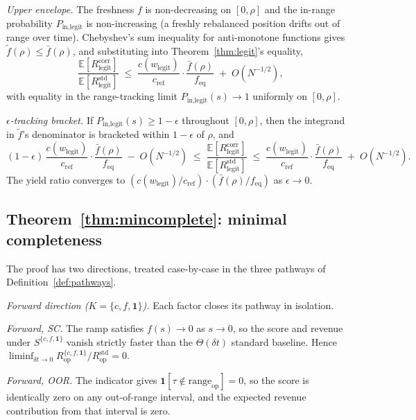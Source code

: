 \documentclass[11pt,a4paper]{article}
\theoremstyle{definition}
\theoremstyle{plain}
\theoremstyle{remark}
\begin{document}
\noindent\emph{Upper envelope.} The freshness $f$ is non-decreasing on $[0, \rho]$ and the in-range probability $P_{\text{in,legit}}$ is non-increasing (a freshly rebalanced position drifts out of range over time). Chebyshev's sum inequality for anti-monotone functions gives $\tilde f(\rho) \leq \bar f(\rho)$, and substituting into Theorem~\ref{thm:legit}'s equality,
\begin{equation}\label{eq:thm2upper}
\frac{\mathbb{E}[R^{\text{corr}}_{\text{legit}}]}{\mathbb{E}[R^{\text{std}}_{\text{legit}}]} \;\leq\; \frac{c(w_{\text{legit}})}{c_{\text{ref}}} \cdot \frac{\bar f(\rho)}{f_{\text{eq}}} \;+\; O(N^{-1/2}),
\end{equation}
with equality in the range-tracking limit $P_{\text{in,legit}}(s) \to 1$ uniformly on $[0, \rho]$.

\noindent\emph{$\epsilon$-tracking bracket.} If $P_{\text{in,legit}}(s) \geq 1 - \epsilon$ throughout $[0, \rho]$, then the integrand in $\tilde f$'s denominator is bracketed within $1 - \epsilon$ of $\rho$, and
\begin{equation}\label{eq:thm2lower}
(1 - \epsilon)\,\frac{c(w_{\text{legit}})}{c_{\text{ref}}} \cdot \frac{\bar f(\rho)}{f_{\text{eq}}} \;-\; O(N^{-1/2}) \;\leq\; \frac{\mathbb{E}[R^{\text{corr}}_{\text{legit}}]}{\mathbb{E}[R^{\text{std}}_{\text{legit}}]} \;\leq\; \frac{c(w_{\text{legit}})}{c_{\text{ref}}} \cdot \frac{\bar f(\rho)}{f_{\text{eq}}} \;+\; O(N^{-1/2}).
\end{equation}
The yield ratio converges to $(c(w_{\text{legit}})/c_{\text{ref}}) \cdot (\bar f(\rho)/f_{\text{eq}})$ as $\epsilon \to 0$.

\subsection*{Theorem~\ref{thm:mincomplete}: minimal completeness}

The proof has two directions, treated case-by-case in the three pathways of Definition~\ref{def:pathways}.

\noindent\emph{Forward direction ($K = \{c, f, \mathbf{1}\}$).} Each factor closes its pathway in isolation.

\noindent\emph{Forward, SC.} The ramp satisfies $f(s) \to 0$ as $s \to 0$, so the score and revenue under $S^{\{c,f,\mathbf{1}\}}$ vanish strictly faster than the $\Theta(\delta t)$ standard baseline. Hence $\liminf_{\delta t \to 0} R^{\{c,f,\mathbf{1}\}}_{\text{op}} / R^{\text{std}}_{\text{op}} = 0$.

\noindent\emph{Forward, OOR.} The indicator gives $\mathbf{1}[\tau \notin \text{range}_{\text{op}}] = 0$, so the score is identically zero on any out-of-range interval, and the expected revenue contribution from that interval is zero.
\end{document}
